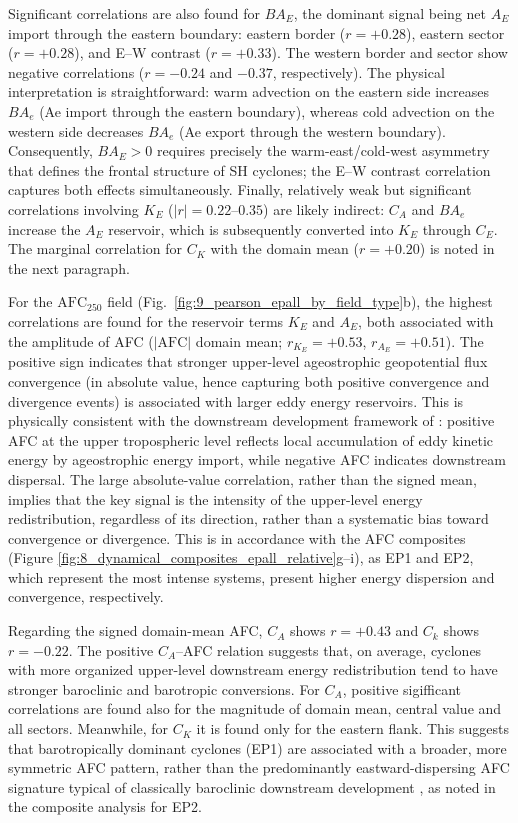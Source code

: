 \documentclass[pdflatex,sn-chicago]{sn-jnl}%
\theoremstyle{plain}
\theoremstyle{definition}
\theoremstyle{remark}
\theoremstyle{definition}
\begin{document}
Significant correlations are also found for $BA_E$, the dominant signal being net $A_E$ import through the eastern boundary: eastern border ($r = +0.28$), eastern sector ($r = +0.28$), and E–W contrast ($r = +0.33$). The western border and sector show negative correlations ($r = -0.24$ and $-0.37$, respectively). The physical interpretation is straightforward: warm advection on the eastern side increases $BA_e$ (Ae import through the eastern boundary), whereas cold advection on the western side decreases $BA_e$ (Ae export through the western boundary). Consequently, $BA_E > 0$ requires precisely the warm-east/cold-west asymmetry that defines the frontal structure of SH cyclones; the E–W contrast correlation captures both effects simultaneously. Finally, relatively weak but significant correlations involving $K_E$ ($|r| = 0.22$–$0.35$) are likely indirect: $C_A$ and $BA_e$ increase the $A_E$ reservoir, which is subsequently converted into $K_E$ through $C_E$. The marginal correlation for $C_K$ with the domain mean ($r = +0.20$) is noted in the next paragraph.

For the $\mathrm{AFC}_{250}$ field (Fig.~\ref{fig:9_pearson_epall_by_field_type}b),
the highest correlations are found for the reservoir terms $K_E$ and $A_E$, both associated with the amplitude of AFC ($|\mathrm{AFC}|$ domain mean; $r_{K_E} = +0.53$, $r_{A_E} = +0.51$). The positive sign indicates that stronger upper-level ageostrophic geopotential flux convergence (in absolute value, hence capturing both positive convergence and divergence events) is associated with larger eddy energy reservoirs. This is physically consistent with the downstream development framework of \citet{orlanski1991life,orlanski1993ageostrophic}: positive AFC at the upper tropospheric level reflects local accumulation of eddy kinetic energy by ageostrophic energy import, while negative AFC indicates downstream dispersal. The large absolute-value correlation, rather than the signed mean, implies that the key signal is the intensity of the upper-level energy redistribution, regardless of its direction, rather than a systematic bias toward convergence or divergence. This is in accordance with the AFC composites (Figure \ref{fig:8_dynamical_composites_epall_relative}g--i), as EP1 and EP2, which represent the most intense systems, present higher energy dispersion and convergence, respectively.

Regarding the signed domain-mean AFC, $C_A$ shows $r = +0.43$ and $C_k$ shows
$r = -0.22$. The positive $C_A$–AFC relation suggests that,
on average, cyclones with more organized upper-level downstream energy redistribution tend to have stronger baroclinic and barotropic conversions. For $C_A$, positive sigifficant correlations are found also for the magnitude of domain mean, central value and all sectors. Meanwhile, for $C_K$ it is found only for the eastern flank. This suggests that barotropically dominant cyclones (EP1) are associated with a broader, more symmetric AFC pattern, rather than the predominantly eastward-dispersing AFC signature typical of classically
baroclinic downstream development \citep{orlanski1991life}, as noted in the composite analysis for EP2.
\end{document}
